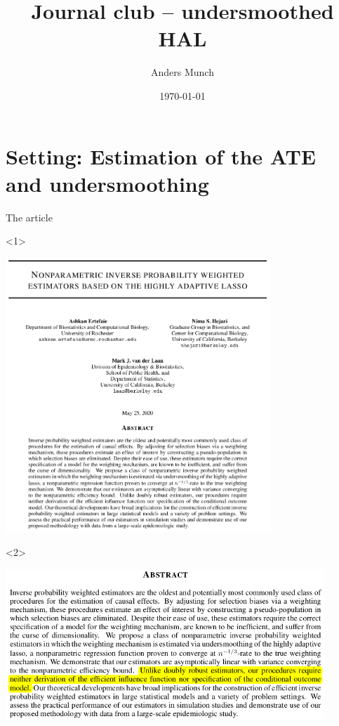 \documentclass[smaller]{beamer}\usepackage{listings}
\author{Anders Munch}
\date{\today}
\title{Journal club -- undersmoothed HAL}
\begin{document}
\maketitle
\section{Setting: Estimation of the ATE and undersmoothing}
\label{sec:org6254a2d}

\begin{frame}[label={sec:orgf2d15cf}]{The article}
\begin{onlyenv}<1>
\begin{center}
\includegraphics[width=0.75\textwidth]{./screenshots/abstract.png}
\end{center}
\end{onlyenv}

\begin{onlyenv}<2>
\begin{center}
\includegraphics[width=0.9\textwidth]{./screenshots/abstract2.png}
\end{center}
\end{onlyenv}
\end{frame}
\end{document}
